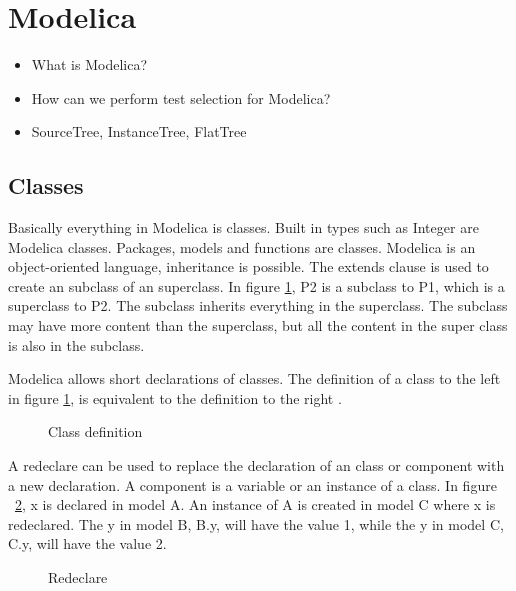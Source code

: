\documentclass{cslthse-msc}
\begin{document}
\section{Modelica}
\begin{itemize}
	\item What is Modelica?
	\item How can we perform test selection for Modelica?
	\item SourceTree, InstanceTree, FlatTree
	\end{itemize}

\subsection{Classes}
Basically everything in Modelica is classes. Built in types such as Integer are Modelica classes. Packages, models and functions are classes. Modelica is an object-oriented language, inheritance is possible. The extends clause is used to create an subclass of an superclass. In figure \ref{fig:classDefinition}, P2 is a subclass to P1, which is a superclass to P2. The subclass inherits everything in the superclass. The subclass may have more content than the superclass, but all the content in the super class is also in the subclass. 

Modelica allows short declarations of classes. The definition of a class to the left in figure \ref{fig:classDefinition}, is equivalent to the definition to the right \cite{modelicamodelica}.

\begin{figure}[H]
    \centering
    \subfloat{{}}
    \qquad
    \subfloat{{}}
    \caption{Class definition}
    \label{fig:classDefinition}
\end{figure}

A redeclare can be used to replace the declaration of an class or component with a new declaration. A component is a variable or an instance of a class. In figure ~\ref{fig:redeclare}, x is declared in model A. An instance of A is created in model C where x is redeclared. The y in model B, B.y, will have the value 1, while the y in model C, C.y, will have the value 2.

\begin{figure}[H]
	
    \caption{Redeclare}
    \label{fig:redeclare}
\end{figure}
\end{document}
